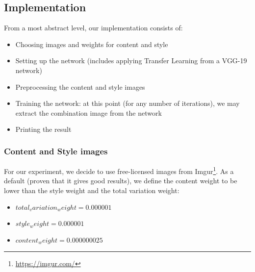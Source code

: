 \subsection{Implementation}
From a most abstract level, our implementation consists of:
\begin{itemize}
    \item Choosing images and weights for content and style
    \item Setting up the network (includes applying Transfer Learning from a VGG-19 network)
    \item Preprocessing the content and style images
    \item Training the network: at this point (for any number of iterations), we may extract the combination image from the network
    \item Printing the result
\end{itemize}
\subsubsection{Content and Style images}
For our experiment, we decide to use free-licensed images from Imgur\footnote{\href{https://imgur.com/}{https://imgur.com/}}.
As a default (proven that it gives good results), we define the content weight to be lower than the style weight and the total variation weight:
\begin{itemize}
    \item $total_variation_weight = 0.000001$
    \item $style_weight = 0.000001$
    \item $content_weight = 0.000000025$
\end{itemize}
